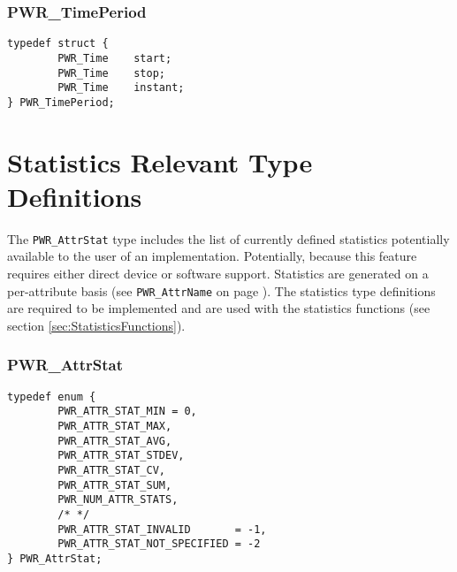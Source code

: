 \documentclass[12pt]{report} %
\begin{document}
\subsubsection{PWR_TimePeriod}\label{type:TimePeriod}

\begin{center}
\begin{minipage}{.95\linewidth}%
\begin{lstlisting}
typedef struct {
        PWR_Time    start;
        PWR_Time    stop;
        PWR_Time    instant;
} PWR_TimePeriod;
\end{lstlisting}
\end{minipage}
\end{center}

\section{Statistics Relevant Type Definitions}\label{sec:StatisticTypeDefinitions}
The \texttt{PWR_AttrStat} type includes the list of currently defined statistics potentially available to the user of an implementation.
Potentially, because this feature requires either direct device or software support.
Statistics are generated on a per-attribute basis (see \texttt{PWR_AttrName} on page \pageref{type:AttrName}). 
The statistics type definitions are required to be implemented and are used with the statistics functions (see section \ref{sec:StatisticsFunctions}).


\subsubsection{PWR_AttrStat}\label{type:AttrStat}

\begin{center}
\begin{minipage}{.95\linewidth}%
\begin{lstlisting}
typedef enum {
        PWR_ATTR_STAT_MIN = 0,
        PWR_ATTR_STAT_MAX,
        PWR_ATTR_STAT_AVG,
        PWR_ATTR_STAT_STDEV,
        PWR_ATTR_STAT_CV,
        PWR_ATTR_STAT_SUM,
        PWR_NUM_ATTR_STATS,
        /* */
        PWR_ATTR_STAT_INVALID       = -1,
        PWR_ATTR_STAT_NOT_SPECIFIED = -2
} PWR_AttrStat;
\end{lstlisting}
\end{minipage}
\end{center}
\end{document}
